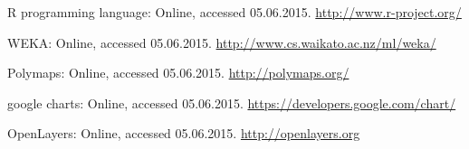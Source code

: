 \documentclass[12pt]{aghdpl}
\begin{document}
\begin{thebibliography}{99}
R programming language: Online, accessed 05.06.2015. \href{http://www.r-project.org/}{http://www.r-project.org/}

WEKA: Online, accessed 05.06.2015. \href{http://www.cs.waikato.ac.nz/ml/weka/}{http://www.cs.waikato.ac.nz/ml/weka/}

Polymaps: Online, accessed 05.06.2015. \href{http://polymaps.org/}{http://polymaps.org/}

google charts: Online, accessed 05.06.2015. \href{https://developers.google.com/chart/}{https://developers.google.com/chart/}

OpenLayers: Online, accessed 05.06.2015. \href{http://openlayers.org}{http://openlayers.org}


\end{thebibliography}
\end{document}
